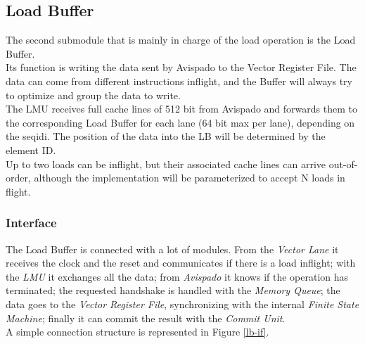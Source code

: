 \subsection{Load Buffer}
The second submodule that is mainly in charge of the load operation is the Load Buffer.\\
Its function is writing the data sent by Avispado to the Vector Register File. The data can come from different instructions inflight, and the Buffer will always try to optimize and group the data to write.\\

The LMU receives full cache lines of 512 bit from Avispado and forwards them to the corresponding Load Buffer for each lane (64 bit max per lane), depending on the seq\+id\+i. The position of the data into the LB will be determined by the element ID.\\

Up to two loads can be inflight, but their associated cache lines can arrive out-of-order, although the implementation will be parameterized to accept N loads in flight.
\subsubsection{Interface}
The Load Buffer is connected with a lot of modules. From the \emph{Vector Lane} it receives the clock and the reset and communicates if there is a load inflight; with the \emph{LMU} it exchanges all the data; from \emph{Avispado} it knows if the operation has terminated; the requested handshake is handled with the \emph{Memory Queue}; the data goes to the \emph{Vector Register File}, synchronizing with the internal \emph{Finite State Machine}; finally it can commit the result with the \emph{Commit Unit}.\\

A simple connection structure is represented in Figure \ref{lb-if}.


